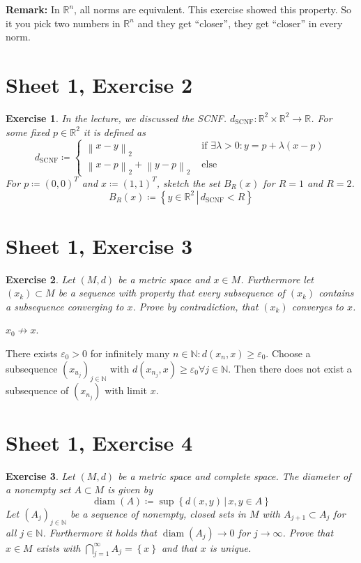 \documentclass{article}
\newtheorem{ex}{Exercise} %
\newcommand{\set}[1]{\left\{#1\right\}}
\newcommand{\setdef}[2]{\left\{\left.#1\,\right|\,#2\right\}}
\newcommand{\norm}[1]{\left\|#1\right\|}
\begin{document}
\textbf{Remark:}
In $\mathbb R^n$, all norms are equivalent.
This exercise showed this property.
So it you pick two numbers in $\mathbb R^n$ and they get \enquote{closer}, they get \enquote{closer} in every norm.

\section{Sheet 1, Exercise 2}

\begin{ex}
  In the lecture, we discussed the SCNF. $d_{\text{SCNF}}: \mathbb R^2 \times \mathbb R^2 \to \mathbb R$.
  For some fixed $p \in \mathbb R^2$ it is defined as
  \[
    d_{\text{SCNF}} \coloneqq \begin{cases}
      \norm{x - y}_2 & \text{ if } \exists \lambda > 0: y = p + \lambda (x - p) \\
      \norm{x - p}_2 + \norm{y - p}_2 & \text{ else}
    \end{cases}
  \]
  For $p \coloneqq (0,0)^T$ and $x \coloneqq (1,1)^T$, sketch the set $B_R(x)$ for $R=1$ and $R=2$.
  \[ B_R(x) \coloneqq \setdef{y \in \mathbb R^2}{d_{\text{SCNF}} < R} \]
\end{ex}

\section{Sheet 1, Exercise 3}

\begin{ex}
  Let $(M, d)$ be a metric space and $x \in M$.
  Furthermore let $(x_k) \subset M$ be a sequence with property that every subsequence of $(x_k)$ contains a subsequence converging to $x$.
  Prove by contradiction, that $(x_k)$ converges to $x$.
\end{ex}

$x_0 \not\to x$.

There exists $\varepsilon_0 > 0$ for infinitely many $n \in \mathbb N: d(x_n, x) \geq \varepsilon_0$.
Choose a subsequence $(x_{u_j})_{j\in\mathbb N}$ with $d(x_{n_j}, x) \geq \varepsilon_0 \forall j \in \mathbb N$.
Then there does not exist a subsequence of $(x_{n_j})$ with limit $x$.

\section{Sheet 1, Exercise 4}

\begin{ex}
  Let $(M, d)$ be a metric space and complete space. The diameter of a nonempty set $A \subset M$ is given by
  \[ \operatorname{diam}(A) \coloneqq \sup\setdef{d(x,y)}{x,y \in A} \]
  Let $(A_j)_{j\in\mathbb N}$ be a sequence of nonempty, closed sets in $M$ with $A_{j+1} \subset A_j$ for all $j \in \mathbb N$.
  Furthermore it holds that $\operatorname{diam}(A_j) \to 0$ for $j \to \infty$. Prove that $x \in M$ exists with
  $\bigcap_{j=1}^\infty A_j = \set{x}$ and that $x$ is unique.
\end{ex}
\end{document}
